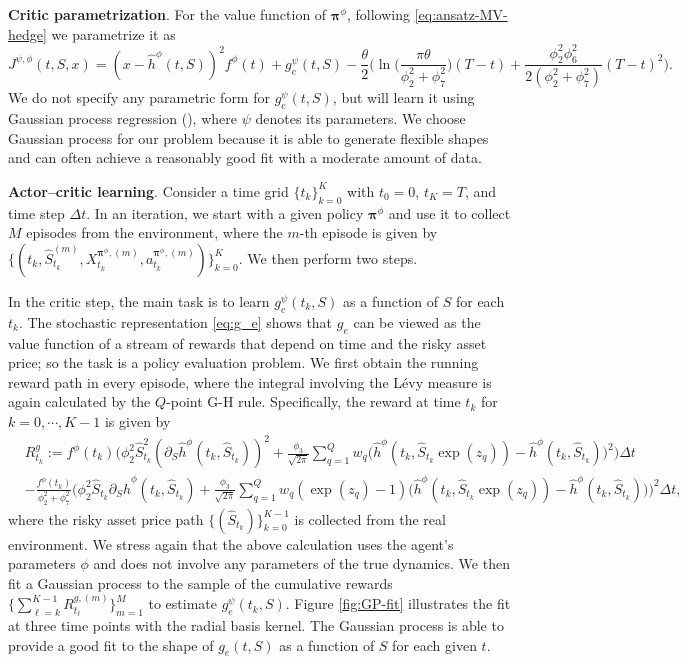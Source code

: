 \documentclass[11pt]{article}
\newcommand{\1}{\mathbbm{1}}
\newcommand{\bpi}{\boldsymbol{\pi}}
\begin{document}
\textbf{Critic parametrization}. For the value function of $\bpi^{\phi}$, following \eqref{eq:ansatz-MV-hedge} we parametrize it as
\begin{equation}
	J^{\psi,\phi}(t,S,x) = (x-\hat{h}^{\phi}(t,S))^2 f^\phi(t)
	  + g_e^{\psi}(t,S) - \frac{\theta}{2}\bigg(\ln\bigg(\frac{\pi\theta}{\phi_2^2 + \phi_7^2}\bigg) (T - t) + \frac{\phi_2^2\phi_6^2}{2(\phi_2^2 + \phi_7^2)}(T-t)^2\bigg).
\end{equation}
We do not specify any parametric form for $g_e^{\psi}(t,S)$, but will learn it using Gaussian process regression (\citealp{williams2006gaussian}), where $\psi$ denotes its parameters.
We choose Gaussian process for our problem because it is able to generate flexible shapes and  can often achieve a reasonably good fit with a moderate amount of data.

\textbf{Actor--critic learning}.  Consider a time grid $\{t_k\}_{k=0}^K$ with $t_0=0$, $t_K=T$, and time step $\Delta t$. In an iteration, we start with a given policy $\bpi^{\phi}$ and use it to collect $M$ episodes from the environment, where the $m$-th episode is given by $\{(t_k, \hat{S}_{t_k}^{(m)}, X_{t_k}^{\bpi^\phi,(m)}, a_{t_k}^{\bpi^\phi,(m)})\}_{k=0}^K$. We then perform two steps.

In the critic step, the main task is to learn $g_e^{\psi}(t_k,S)$ as a function of $S$ for each $t_k$. The stochastic representation \eqref{eq:g_e}  shows that $g_e$ can be viewed as the value function of a stream of rewards that depend on time and the risky asset price; so the task is a policy evaluation problem. We first obtain the running reward path in every episode, where the integral involving the L\'evy measure is again calculated by the $Q$-point G-H rule. Specifically, the reward at time $t_k$ for $k=0,\cdots, K-1$ is given by
\begin{align}
&R_{t_k}^g:=f^\phi(t_k)\bigg(\phi_2^2 \hat{S}_{t_k}^2(\partial_S\hat{h}^\phi(t_k,\hat{S}_{t_k}))^2 + \frac{\phi_3}{\sqrt{2\pi}}\sum_{q=1}^Qw_q\big(\hat{h}^{\phi}(t_k,\hat{S}_{t_k}\exp(z_q))-\hat{h}^{\phi}(t_k,\hat{S}_{t_k})\big)^2\bigg)\Delta t \\
&-\frac{f^\phi(t_k)}{\phi_2^2+\phi_7^2}\bigg(\phi_2^2\hat{S}_{t_k}\partial_S\hat{h}^\phi(t_k,\hat{S}_{t_k}) + \frac{\phi_3}{\sqrt{2\pi}}\sum_{q=1}^Qw_q(\exp(z_q)-1)\big(\hat{h}^\phi(t_k,\hat{S}_{t_k}\exp(z_q))-\hat{h}^\phi(t_k,\hat{S}_{t_k})\big)\bigg)^2\Delta t,
\end{align}
where the risky asset price path $\{(\hat{S}_{t_k})\}_{k=0}^{K-1}$ is collected from the real environment.
We stress again that the above calculation uses the agent's parameters $\phi$ and does not involve any parameters of the true dynamics. We then fit a Gaussian process to the sample of the cumulative rewards $\{\sum_{\ell=k}^{K-1}R_{t_\ell}^{g,(m)}\}_{m=1}^M$ to estimate $g_e^{\psi}(t_k,S)$. Figure \ref{fig:GP-fit} illustrates the fit at three time points with the radial basis kernel. %
The Gaussian process is able to provide a good fit to the shape of $g_e(t,S)$ as a function of $S$ for each given $t$.
\end{document}
